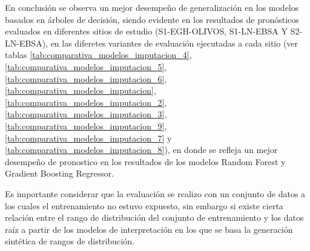 En conclusión se observa un mejor desempeño de generalización en los modelos basados en árboles de decisión, siendo evidente en los resultados de pronósticos evaluados en diferentes sitios de estudio (S1-EGH-OLIVOS, S1-LN-EBSA Y S2-LN-EBSA), en las diferetes variantes de evaluación ejecutadas a cada sitio (ver tablas \ref{tab:comparativa_modelos_imputacion_4}, \ref{tab:comparativa_modelos_imputacion_5}, \ref{tab:comparativa_modelos_imputacion_6}, \ref{tab:comparativa_modelos_imputacion}, \ref{tab:comparativa_modelos_imputacion_2}, \ref{tab:comparativa_modelos_imputacion_3}, \ref{tab:comparativa_modelos_imputacion_9}, \ref{tab:comparativa_modelos_imputacion_7} y \ref{tab:comparativa_modelos_imputacion_8}), en donde se refleja un mejor desempeño de pronostico en los resultados de los modelos Random Forest y Gradient Boosting Regressor.

Es importante considerar que la evaluación se realizo con un conjunto de datos a los cuales el entrenamiento no estuvo expuesto, sin embargo si existe cierta relación entre el rango de distribución del conjunto de entrenamiento y los datos raíz a partir de los modelos de interpretación en los que se basa la generación sintética de rangos de distribución. 

